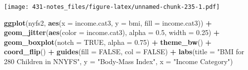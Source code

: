 \documentclass[
]{book}
\newenvironment{Shaded}{\begin{snugshade}}{\end{snugshade}}
\newcommand{\DataTypeTok}[1]{\textcolor[rgb]{0.13,0.29,0.53}{#1}}
\newcommand{\FloatTok}[1]{\textcolor[rgb]{0.00,0.00,0.81}{#1}}
\newcommand{\KeywordTok}[1]{\textcolor[rgb]{0.13,0.29,0.53}{\textbf{#1}}}
\newcommand{\NormalTok}[1]{#1}
\newcommand{\OperatorTok}[1]{\textcolor[rgb]{0.81,0.36,0.00}{\textbf{#1}}}
\newcommand{\OtherTok}[1]{\textcolor[rgb]{0.56,0.35,0.01}{#1}}
\newcommand{\StringTok}[1]{\textcolor[rgb]{0.31,0.60,0.02}{#1}}
\begin{document}
\begin{Shaded}
\end{Shaded}

\texttt{[image: 431-notes\_files/figure-latex/unnamed-chunk-235-1.pdf]}

\begin{Shaded}
\begin{Highlighting}[]
\KeywordTok{ggplot}\NormalTok{(nyfs2, }\KeywordTok{aes}\NormalTok{(}\DataTypeTok{x =}\NormalTok{ income.cat3, }\DataTypeTok{y =}\NormalTok{ bmi, }\DataTypeTok{fill =}\NormalTok{ income.cat3)) }\OperatorTok{+}
\StringTok{  }\KeywordTok{geom_jitter}\NormalTok{(}\KeywordTok{aes}\NormalTok{(}\DataTypeTok{color =}\NormalTok{ income.cat3), }\DataTypeTok{alpha =} \FloatTok{0.5}\NormalTok{, }\DataTypeTok{width =} \FloatTok{0.25}\NormalTok{) }\OperatorTok{+}
\StringTok{  }\KeywordTok{geom_boxplot}\NormalTok{(}\DataTypeTok{notch =} \OtherTok{TRUE}\NormalTok{, }\DataTypeTok{alpha =} \FloatTok{0.75}\NormalTok{) }\OperatorTok{+}
\StringTok{  }\KeywordTok{theme_bw}\NormalTok{() }\OperatorTok{+}
\StringTok{  }\KeywordTok{coord_flip}\NormalTok{() }\OperatorTok{+}
\StringTok{  }\KeywordTok{guides}\NormalTok{(}\DataTypeTok{fill =} \OtherTok{FALSE}\NormalTok{, }\DataTypeTok{col =} \OtherTok{FALSE}\NormalTok{) }\OperatorTok{+}
\StringTok{  }\KeywordTok{labs}\NormalTok{(}\DataTypeTok{title =} \StringTok{"BMI for 280 Children in NNYFS"}\NormalTok{,}
       \DataTypeTok{y =} \StringTok{"Body-Mass Index"}\NormalTok{, }\DataTypeTok{x =} \StringTok{"Income Category"}\NormalTok{)}
\end{Highlighting}
\end{Shaded}
\end{document}
